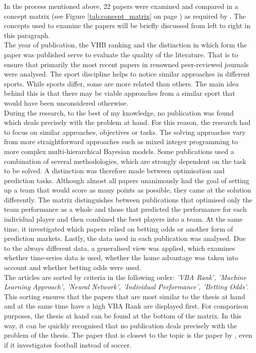 In the process mentioned above, 22 papers were examined and compared in a concept matrix (see Figure \ref{tab:concept_matrix} on page \pageref{tab:concept_matrix}) as required by \citet{webster_guest_2002}. The concepts used to examine the papers will be briefly discussed from left to right in this paragraph. \\
\indent The year of publication, the VHB ranking and the distinction in which form the paper was published serve to evaluate the quality of the literature. That is to ensure that primarily the most recent papers in renowned peer-reviewed journals were analysed. The sport discipline helps to notice similar approaches in different sports. While sports differ, some are more related than others. The main idea behind this is that there may be viable approaches from a similar sport that would have been unconsidered otherwise.  \\
\indent During the research, to the best of my knowledge, no publication was found which deals precisely with the problem at hand. For this reason, the research had to focus on similar approaches, objectives or tasks. The solving approaches vary from more straightforward approaches such as mixed integer programming to more complex multi-hierarchical Bayesian models. Some publications used a combination of several methodologies, which are strongly dependent on the task to be solved. A distinction was therefore made between optimisation and prediction tasks. Although almost all papers unanimously had the goal of setting up a team that would score as many points as possible, they came at the solution differently. The matrix distinguishes between publications that optimised only the team performance as a whole and those that predicted the performance for each individual player and then combined the best players into a team. At the same time, it investigated which papers relied on betting odds or another form of prediction markets. Lastly, the data used in each publication was analysed. Due to the always different data, a generalised view was applied, which examines whether time-series data is used, whether the home advantage was taken into account and whether betting odds were used. \\
\indent The articles are sorted by criteria in the following order: \emph{'VBA Rank', 'Machine Learning Approach', 'Neural Network', 'Individual Performance', 'Betting Odds'}. This sorting ensures that the papers that are most similar to the thesis at hand and at the same time have a high VBA Rank are displayed first. For comparison purposes, the thesis at hand can be found at the bottom of the matrix. In this way, it can be quickly recognised that no publication deals precisely with the problem of the thesis. The paper that is closest to the topic is the paper by \citet{landers_machine_2019}, even if it investigates football instead of soccer.

